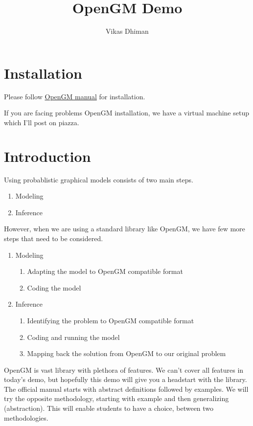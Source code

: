 \documentclass[12pt,oneside,letterpaper]{article}
\title{OpenGM Demo}
\author{Vikas Dhiman}
\begin{document}
\maketitle
\section{Installation}
Please follow \href{http://www.andres.sc/publications/opengm-2.0.2-beta-manual.pdf}{OpenGM manual} for installation.

If you are facing problems OpenGM installation, we have a virtual machine setup
which I'll post on piazza. 

\section{Introduction}
Using probablistic graphical models consists of two main steps. 
\begin{enumerate}
  \item Modeling
  \item Inference
\end{enumerate}

However, when we are using a standard library like OpenGM, we have few more steps that need to be considered.
\begin{enumerate}
  \item Modeling
  \begin{enumerate}
    \item Adapting the model to OpenGM compatible format
    \item Coding the model
  \end{enumerate}
  \item Inference
    \begin{enumerate}
      \item Identifying the problem to OpenGM compatible format
      \item Coding and running the model
      \item Mapping back the solution from OpenGM to our original problem
    \end{enumerate}
\end{enumerate}

OpenGM is vast library with plethora of features. We can't cover all features
in today's demo, but hopefully this demo will give you a headstart with the
library. The official manual starts with abstract definitions followed by
examples. We will try the opposite methodology, starting with example and then
generalizing (abstraction). This will enable students to have a choice, between two methodologies.
\end{document}
